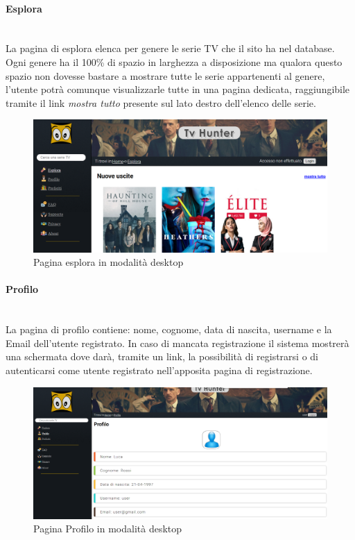 \paragraph{Esplora}
~\\	
La pagina di esplora elenca per genere le serie TV che il sito ha nel database. Ogni genere ha il 100\% di spazio in larghezza a disposizione ma qualora questo spazio non dovesse bastare a mostrare tutte le serie appartenenti al genere, l'utente potrà comunque visualizzarle tutte in una pagina dedicata, raggiungibile tramite il link \textit{mostra tutto} presente sul lato destro dell'elenco delle serie.
\begin{figure}[H]
	\centerline{\includegraphics[scale=0.33]{img/esplora.png}}
	\caption{Pagina esplora in modalità desktop}
	\label{fig:addForm}
\end{figure}	

\paragraph{Profilo}
~\\
La pagina di profilo contiene: nome, cognome, data di nascita, username e la Email dell'utente registrato. In caso di mancata registrazione il sistema mostrerà una schermata dove darà, tramite un link, la possibilità di registrarsi o di autenticarsi come utente registrato nell'apposita pagina di registrazione. 
\begin{figure}[H]
	\centerline{\includegraphics[scale= 0.33]{img/profilo.png}}
	\caption{Pagina Profilo in modalità desktop}
\end{figure}




